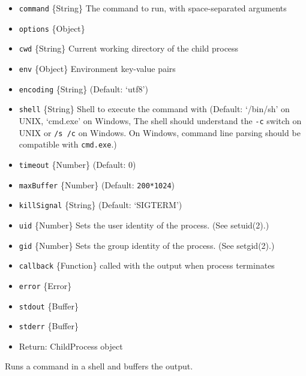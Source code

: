\begin{itemize}
\itemsep1pt\parskip0pt
\item
  \texttt{command} \{String\} The command to run, with space-separated
  arguments
\item
  \texttt{options} \{Object\}
\item
  \texttt{cwd} \{String\} Current working directory of the child process
\item
  \texttt{env} \{Object\} Environment key-value pairs
\item
  \texttt{encoding} \{String\} (Default: `utf8')
\item
  \texttt{shell} \{String\} Shell to execute the command with (Default:
  `/bin/sh' on UNIX, `cmd.exe' on Windows, The shell should understand
  the \texttt{-c} switch on UNIX or \texttt{/s\ /c} on Windows. On
  Windows, command line parsing should be compatible with
  \texttt{cmd.exe}.)
\item
  \texttt{timeout} \{Number\} (Default: 0)
\item
  \texttt{maxBuffer} \{Number\} (Default: \texttt{200*1024})
\item
  \texttt{killSignal} \{String\} (Default: `SIGTERM')
\item
  \texttt{uid} \{Number\} Sets the user identity of the process. (See
  setuid(2).)
\item
  \texttt{gid} \{Number\} Sets the group identity of the process. (See
  setgid(2).)
\item
  \texttt{callback} \{Function\} called with the output when process
  terminates
\item
  \texttt{error} \{Error\}
\item
  \texttt{stdout} \{Buffer\}
\item
  \texttt{stderr} \{Buffer\}
\item
  Return: ChildProcess object
\end{itemize}

Runs a command in a shell and buffers the output.

\begin{Shaded}
\begin{Highlighting}[]
 \NormalTok{(}\NormalTok{,}

\NormalTok{(}\NormalTok{,}
   
    \NormalTok{(} 
    \NormalTok{(} 
     \NormalTok{) \{}
      \NormalTok{(} 
    \NormalTok{\}}
\NormalTok{\});}
\end{Highlighting}
\end{Shaded}

